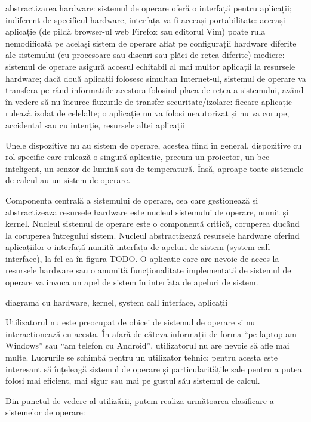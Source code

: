 abstractizarea hardware: sistemul de operare oferă o interfață pentru aplicații; indiferent de specificul hardware, interfața va fi aceeași
portabilitate: aceeași aplicație (de pildă browser-ul web Firefox sau editorul Vim) poate rula nemodificată pe același sistem de operare aflat pe configurații hardware diferite ale sistemului (cu procesoare sau discuri sau plăci de rețea diferite)
mediere: sistemul de operare asigură accesul echitabil al mai multor aplicații la resursele hardware; dacă două aplicații folosesc simultan Internet-ul, sistemul de operare va transfera pe rând informațiile acestora folosind placa de rețea a sistemului, având în vedere să nu încurce fluxurile de transfer
securitate/izolare: fiecare aplicație rulează izolat de celelalte; o aplicație nu va folosi neautorizat și nu va corupe, accidental sau cu intenție, resursele altei aplicații

Unele dispozitive nu au sistem de operare, acestea fiind în general, dispozitive cu rol specific care rulează o singură aplicație, precum un proiector, un bec inteligent, un senzor de lumină sau de temperatură. Însă, aproape toate sistemele de calcul au un sistem de operare.

Componenta centrală a sistemului de operare, cea care gestionează și abstractizează resursele hardware este nucleul sistemului de operare, numit și kernel. Nucleul sistemul de operare este o componentă critică, coruperea ducând la coruperea întregului sistem. Nucleul abstractizează resursele hardware oferind aplicațiilor o interfață numită interfața de apeluri de sistem (system call interface), la fel ca în figura TODO. O aplicație care are nevoie de acces la resursele hardware sau o anumită funcționalitate implementată de sistemul de operare va invoca un apel de sistem în interfața de apeluri de sistem.

diagramă cu hardware, kernel, system call interface, aplicații

Utilizatorul nu este preocupat de obicei de sistemul de operare și nu interacționează cu acesta. În afară de câteva informații de forma “pe laptop am Windows” sau “am telefon cu Android”, utilizatorul nu are nevoie să afle mai multe. Lucrurile se schimbă pentru un utilizator tehnic; pentru acesta este interesant să înțeleagă sistemul de operare și particularitățile sale pentru a putea folosi mai eficient, mai sigur sau mai pe gustul său sistemul de calcul.

Din punctul de vedere al utilizării, putem realiza următoarea clasificare a sistemelor de operare:

